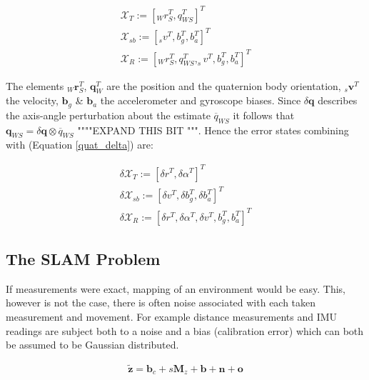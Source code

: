 \documentclass[a4paper,11pt,notitlepage]{article}
\begin{document}
\begin{equation}
\begin{aligned}
\label{states_1}
\mathcal{X}_{T} := [ _{W}r_{S}^{T},q_{WS}^{T} ]^{T} \\
\mathcal{X}_{sb} := [ _{s}v^{T},b_{g}^{T}, b_{a}^{T} ]^{T} \\
\mathcal{X}_{R} := [ _{W}r_{S}^{T},q_{WS}^{T},_{s}v^{T},b_{g}^{T}, b_{a}^{T}]^{T}
\end{aligned}
\end{equation}

The elements $_{W}\textbf{r}_{S}^{T}$, $\textbf{{q}}_{W}^{T}$ are the position and the quaternion body orientation, $_{s}\textbf{{v}}^{T}$ the velocity, $\textbf{{b}}_{g}$ \& $\textbf{{b}}_{a}$ the accelerometer and gyroscope biases. Since $\delta \textbf{q}$ describes the axis-angle perturbation about the estimate $\overline{q}_{WS}$ it follows that $\textbf{q}_{WS} = \delta \textbf{q} \otimes \overline{q}_{WS}$ """"EXPAND THIS BIT """. Hence the error states combining with (Equation \ref{quat_delta}) are:

\begin{equation}
\begin{aligned}
\label{states_2}
\delta \mathcal{X}_{T} := [ \delta r^{T}, \delta \alpha^{T} ]^{T} \\
\delta \mathcal{X}_{sb} := [ \delta v^{T}, \delta b_{g}^{T},\delta b_{a}^{T} ]^{T} \\
\delta \mathcal{X}_{R} := [ \delta r^{T}, \delta \alpha^{T}, \delta v^{T},b_{g}^{T}, b_{a}^{T}]^{T}
\end{aligned}
\end{equation}


\subsection{The SLAM Problem}

If measurements were exact, mapping of an environment would be easy. This, however is not the case, there is often noise associated with each taken measurement and movement. For example distance measurements and IMU readings are subject both to a noise and a bias (calibration error) which can both be assumed to be Gaussian distributed.

\begin{equation}
\begin{aligned}
\mathbf{\tilde{z}} = \textbf{b}_{c} + s\textbf{M}_{z} + \textbf{b} + \textbf{n} + \textbf{o}
\end{aligned}
\label{measurement_model}
\end{equation}
\end{document}
